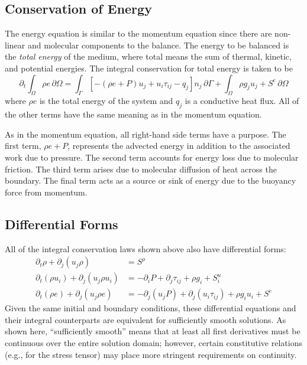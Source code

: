 \documentclass[Prelim,12pt]{WisconsinThesis}
\newcommand{\pdt}   {\partial_t}
\newcommand{\pdi}   {\partial_i}
\newcommand{\pdj}   {\partial_j}
\newcommand{\V}     {\ensuremath{\Omega}}
\newcommand{\dV}    {\,\partial\V}
\newcommand{\IntV}  {\int_{\V}}
\renewcommand{\S}   {\ensuremath{\Gamma}}
\newcommand{\dS}    {\,\partial\S}
\newcommand{\IntS}  {\int_{\S}}
\begin{document}
\subsection{Conservation of Energy}
The energy equation is similar to the momentum equation since there are non-linear and molecular components to the balance.
The energy to be balanced is the \textit{total energy} of the medium, where total means the sum of thermal, kinetic, and potential energies.
The integral conservation for total energy is taken to be
\begin{equation}
    \pdt \IntV \rho e \dV = \IntS \left[- (\rho{e} + P) u_j + u_i \tau_{ij} - q_j\right] n_j\dS + \IntV \rho g_j u_j + S^e \dV
    \label{Eqn:IntegralCoE}
\end{equation}
where $\rho{e}$ is the total energy of the system and $q_j$ is a conductive heat flux.
All of the other terms have the same meaning as in the momentum equation.

As in the momentum equation, all right-hand side terms have a purpose.
The first term, $\rho{e} + P$, represents the advected energy in addition to the associated work due to pressure.
The second term accounts for energy loss due to molecular friction.
The third term arises due to molecular diffusion of heat across the boundary.
The final term acts as a source or sink of energy due to the buoyancy force from momentum.


\subsection{Differential Forms}
All of the integral conservation laws shown above also have differential forms:
\begin{align}
    \pdt \rho + \pdj(u_j \rho)           &= S^\rho \\
    \pdt (\rho u_i) + \pdj(u_j \rho u_i) &= -\pdi{P} + \pdj \tau_{ij} + \rho g_i + S^u_i \\
    \pdt (\rho e) + \pdj(u_j \rho{e})    &= -\pdj(u_j P) + \pdj(u_i \tau_{ij}) + \rho g_i u_i + S^e
\end{align}
Given the same initial and boundary conditions, these differential equations and their integral counterparts are equivalent for sufficiently smooth solutions.
As shown here, ``sufficiently smooth'' means that at least all first derivatives must be continuous over the entire solution domain; however, certain constitutive relations  (e.g., for the stress tensor) may place more stringent requirements on continuity.
\end{document}

